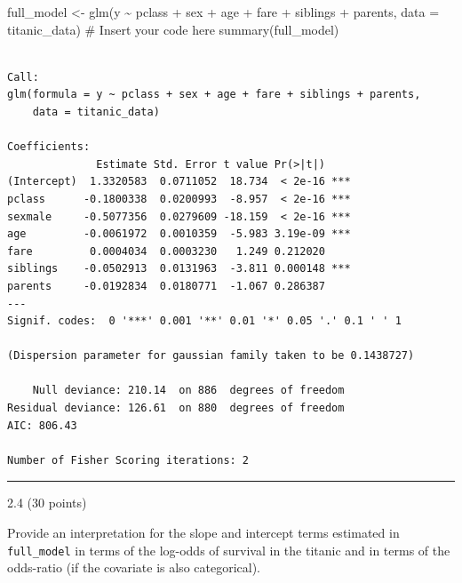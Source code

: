 \documentclass[
  letterpaper,
  DIV=11,
  numbers=noendperiod]{scrartcl}
\newenvironment{Shaded}{\begin{snugshade}}{\end{snugshade}}
\newcommand{\AttributeTok}[1]{\textcolor[rgb]{0.40,0.45,0.13}{#1}}
\newcommand{\CommentTok}[1]{\textcolor[rgb]{0.37,0.37,0.37}{#1}}
\newcommand{\FunctionTok}[1]{\textcolor[rgb]{0.28,0.35,0.67}{#1}}
\newcommand{\NormalTok}[1]{\textcolor[rgb]{0.00,0.23,0.31}{#1}}
\newcommand{\OtherTok}[1]{\textcolor[rgb]{0.00,0.23,0.31}{#1}}
\newcommand{\SpecialCharTok}[1]{\textcolor[rgb]{0.37,0.37,0.37}{#1}}
\begin{document}
\begin{Shaded}
\begin{Highlighting}[]
\NormalTok{full\_model }\OtherTok{\textless{}{-}} \FunctionTok{glm}\NormalTok{(y }\SpecialCharTok{\textasciitilde{}}\NormalTok{ pclass }\SpecialCharTok{+}\NormalTok{ sex }\SpecialCharTok{+}\NormalTok{ age }\SpecialCharTok{+}\NormalTok{ fare }\SpecialCharTok{+}\NormalTok{ siblings }\SpecialCharTok{+}\NormalTok{ parents, }
                  \AttributeTok{data =}\NormalTok{ titanic\_data) }\CommentTok{\# Insert your code here}
\FunctionTok{summary}\NormalTok{(full\_model)}
\end{Highlighting}
\end{Shaded}

\begin{verbatim}

Call:
glm(formula = y ~ pclass + sex + age + fare + siblings + parents, 
    data = titanic_data)

Coefficients:
              Estimate Std. Error t value Pr(>|t|)    
(Intercept)  1.3320583  0.0711052  18.734  < 2e-16 ***
pclass      -0.1800338  0.0200993  -8.957  < 2e-16 ***
sexmale     -0.5077356  0.0279609 -18.159  < 2e-16 ***
age         -0.0061972  0.0010359  -5.983 3.19e-09 ***
fare         0.0004034  0.0003230   1.249 0.212020    
siblings    -0.0502913  0.0131963  -3.811 0.000148 ***
parents     -0.0192834  0.0180771  -1.067 0.286387    
---
Signif. codes:  0 '***' 0.001 '**' 0.01 '*' 0.05 '.' 0.1 ' ' 1

(Dispersion parameter for gaussian family taken to be 0.1438727)

    Null deviance: 210.14  on 886  degrees of freedom
Residual deviance: 126.61  on 880  degrees of freedom
AIC: 806.43

Number of Fisher Scoring iterations: 2
\end{verbatim}

\begin{center}\rule{0.5\linewidth}{0.5pt}\end{center}

2.4 (30 points)

Provide an interpretation for the slope and intercept terms estimated in
\texttt{full\_model} in terms of the log-odds of survival in the titanic
and in terms of the odds-ratio (if the covariate is also categorical).

\hypertarget{section}{%
\subsection{}\label{section}}
\end{document}
